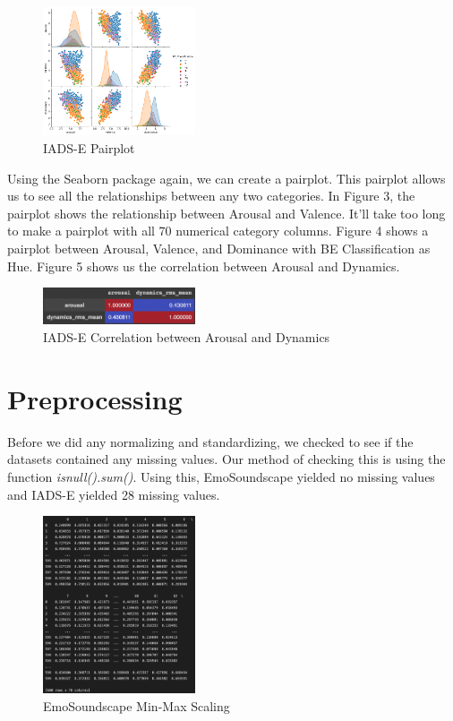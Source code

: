 \documentclass[conference]{IEEEtran}
\begin{document}
{\begin{figure}[h]
\caption{IADS-E Pairplot}
\centering
\includegraphics[width=0.4\textwidth]{Figures/iadpair.png}
\end{figure}

\FloatBarrier

\noindent
Using the Seaborn package again, we can create a pairplot. This pairplot allows us to see all the relationships between any two categories. In Figure 3, the pairplot shows the relationship between Arousal and Valence. It'll take too long to make a pairplot with all 70 numerical category columns. Figure 4 shows a pairplot between Arousal, Valence, and Dominance with BE Classification as Hue. Figure 5 shows us the correlation between Arousal and Dynamics. \\


\begin{figure}[h]
\caption{IADS-E Correlation between Arousal and Dynamics}
\centering
\includegraphics[width=0.4\textwidth]{Figures/iadsecorr.png}
\end{figure}

\section{Preprocessing}
\label{sec:pre}

\noindent
Before we did any normalizing and standardizing, we checked to see if the datasets contained any missing values. Our method of checking this is using the function \emph{isnull().sum()}. Using this, EmoSoundscape yielded no missing values and IADS-E yielded 28 missing values. \\


\begin{figure}[h]
\caption{EmoSoundscape Min-Max Scaling}
\centering
\includegraphics[width=0.40\textwidth]{Figures/min_max_1.png}
\end{figure}

}
\end{document}
